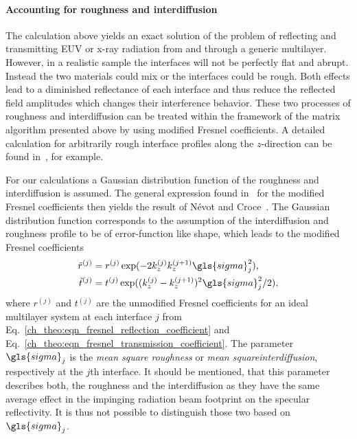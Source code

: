 \paragraph{Accounting for roughness and interdiffusion}
The calculation above yields an exact solution of the problem of reflecting and transmitting EUV or x-ray radiation from and through a generic multilayer. However, in a realistic sample the interfaces will not be perfectly flat and abrupt. Instead the two materials could mix or the interfaces could be rough. Both effects lead to a diminished reflectance of each interface and thus reduce the reflected field amplitudes which changes their interference behavior. These two processes of roughness and interdiffusion can be treated within the framework of the matrix algorithm presented above by using modified Fresnel coefficients. A detailed calculation for arbitrarily rough interface profiles along the $z$-direction can be found in~\cite{vidal_metallic_1984}, for example.

For our calculations a Gaussian distribution function of the roughness and interdiffusion is assumed. The general expression found in~\cite{vidal_metallic_1984} for the modified Fresnel coefficients then yields the result of N\'{e}vot and Croce~\cite{croce_p._etude_1976, nevot_l._caracterisation_1980}. The Gaussian distribution function corresponds to the assumption of the interdiffusion and roughness profile to be of error-function like shape, which leads to the modified Fresnel coefficients
\begin{align}
       \tilde{r}^{(j)} &= r^{(j)} \exp(-2 k_z^{(j)} k_z^{(j+1)} 
\gls{sigma}_j^2)\text{,} \nonumber \\
       \tilde{t}^{(j)} &= t^{(j)} \exp((k_z^{(j)} - k_z^{(j+1)})^2 \gls{sigma}_j^2/2) 
\text{,} \label{ch_theo:eqn_mod_fresnel}
\end{align}
where $r^{(j)}$ and $t^{(j)}$ are the unmodified Fresnel coefficients for an ideal multilayer system at each interface $j$ from Eq.~\eqref{ch_theo:eqn_fresnel_reflection_coefficient} and Eq.~\eqref{ch_theo:eqn_fresnel_transmission_coefficient}. The parameter $\gls{sigma}_j$ is the \emph{mean square roughness} or \emph{mean squareinterdiffusion}, respectively at the $j$th interface. It should be mentioned, that this parameter describes both, the roughness and the interdiffusion as they have the same average effect in the impinging radiation beam footprint on the specular reflectivity. It is thus not possible to distinguish those two based on $\gls{sigma}_j$.

